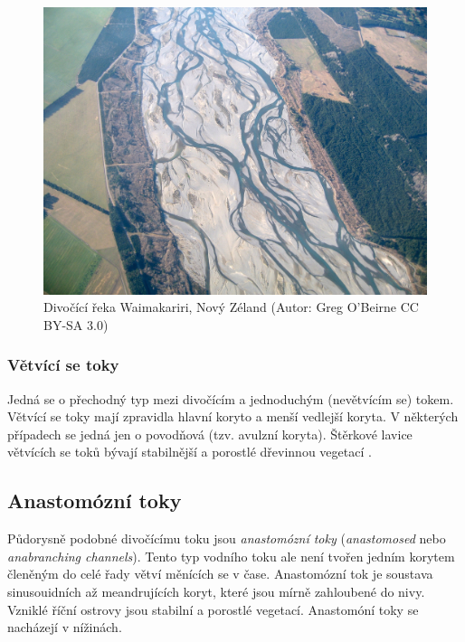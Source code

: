 \begin{figure}[h]
	\centering
	\includegraphics[width=1\linewidth]{obrazky/fluvial/divocici}
	\caption{Divočící řeka Waimakariri, Nový Zéland (Autor: Greg O'Beirne CC BY-SA 3.0)}
	\label{fig:divocici}
\end{figure}

\subsubsection{Větvící se toky}
Jedná se o přechodný typ mezi divočícím a jednoduchým (nevětvícím se) tokem. Větvící se toky mají zpravidla hlavní koryto a menší vedlejší koryta. V některých případech se jedná jen o povodňová (tzv. avulzní koryta). Štěrkové lavice větvících se toků bývají stabilnější a porostlé dřevinnou vegetací \parencite{galiaFluvialniGeomorfologie2017}.

\subsection{Anastomózní toky}
Půdorysně podobné divočícímu toku jsou \emph{anastomózní toky} (\textit{anastomosed} nebo \textit{anabranching channels}). Tento typ vodního toku ale není tvořen jedním korytem členěným do celé řady větví měnících se v čase. Anastomózní tok je soustava sinusouidních až meandrujících koryt, které jsou mírně zahloubené do nivy. Vzniklé říční ostrovy jsou stabilní a porostlé vegetací. Anastomóní toky se nacházejí v nížinách.


